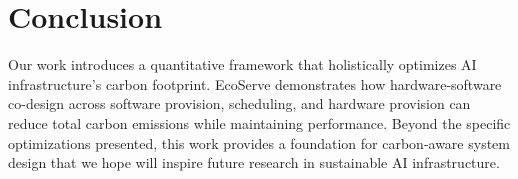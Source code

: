 \section{Conclusion}





Our work introduces a quantitative framework that holistically optimizes AI infrastructure's carbon footprint. EcoServe demonstrates how hardware-software co-design across software provision, scheduling, and hardware provision can reduce total carbon emissions while maintaining performance. Beyond the specific optimizations presented, this work provides a foundation for carbon-aware system design that we hope will inspire future research in sustainable AI infrastructure.







